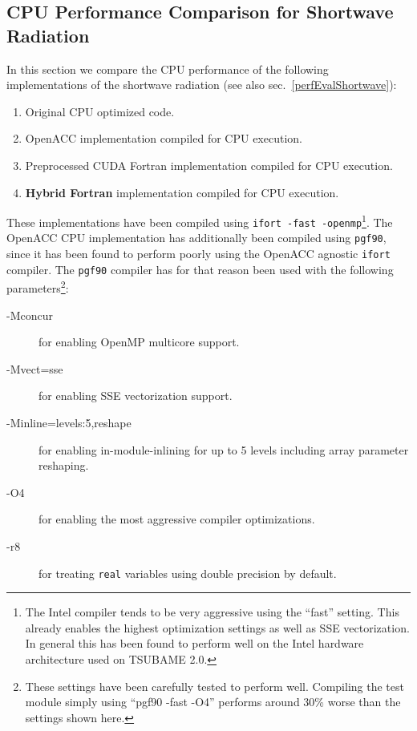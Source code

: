 \subsection{CPU Performance Comparison for Shortwave Radiation} \label{sub:performanceCPUValidation}
In this section we compare the CPU performance of the following implementations of the shortwave radiation (see also sec.~\ref{perfEvalShortwave}):

\begin{enumerate}
 \item Original CPU optimized code.
 \item OpenACC implementation compiled for CPU execution.
 \item Preprocessed CUDA Fortran implementation compiled for CPU execution.
 \item \textbf{Hybrid Fortran} implementation compiled for CPU execution.
\end{enumerate}

These implementations have been compiled using \verb|ifort -fast -openmp|\footnote{The Intel compiler tends to be very aggressive using the ``fast'' setting. This already enables the highest optimization settings as well as SSE vectorization. In general this has been found to perform well on the Intel hardware architecture used on TSUBAME 2.0.}. The OpenACC CPU implementation has additionally been compiled using \verb|pgf90|, since it has been found to perform poorly using the OpenACC agnostic \verb|ifort| compiler. The \verb|pgf90| compiler has for that reason been used with the following parameters\footnote{These settings have been carefully tested to perform well. Compiling the test module simply using ``pgf90 -fast -O4'' performs around 30\% worse than the settings shown here.}:

\begin{description}
 \item [-Mconcur] for enabling OpenMP multicore support.
 \item [-Mvect=sse] for enabling SSE vectorization support.
 \item [-Minline=levels:5,reshape] for enabling in-module-inlining for up to 5 levels including array parameter reshaping.
 \item [-O4] for enabling the most aggressive compiler optimizations.
 \item [-r8] for treating \verb|real| variables using double precision by default.
\end{description}

